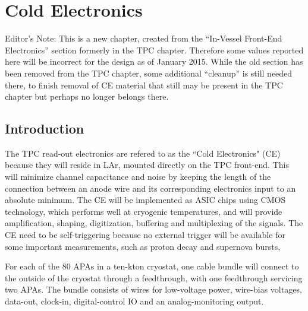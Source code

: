 \chapter{Cold Electronics}
\label{ch:ce}

\begin{editornote}
  Editor's Note:  This is a new chapter, created from the ``In-Vessel Front-End Electronics'' section formerly in the TPC chapter.
Therefore some values reported here will be incorrect for the design as of January 2015. 
While the old section has been removed from the TPC chapter, some additional ``cleanup'' is still needed there,
to finish removal of CE material that still may be present in the TPC chapter but perhaps no longer belongs there.
\end{editornote}
%
\section{Introduction}
\label{sec:ce-intro}

The TPC read-out electronics are refered to as the ``Cold Electronics" (CE) because they will reside in LAr,
mounted directly on the TPC front-end.
This will minimize channel capacitance and noise by keeping the length of the connection between an anode wire
and its corresponding electronics input to an absolute minimum.
The CE will be implemented as ASIC chips using CMOS technology, which performs well at cryogenic temperatures,
and will provide amplification, shaping, digitization, buffering and multiplexing of the signals.
The CE need to be self-triggering because no external trigger will be available for some important measurements,
such as proton decay and supernova bursts,

For each of the 80 APAs in a ten-kton cryostat, one cable bundle will connect to the outside of the cryostat through
a feedthrough, with one feedthrough servicing two APAs.
The bundle consists of wires for low-voltage power, wire-bias voltages, data-out, clock-in,
digital-control IO and an analog-monitoring output.

